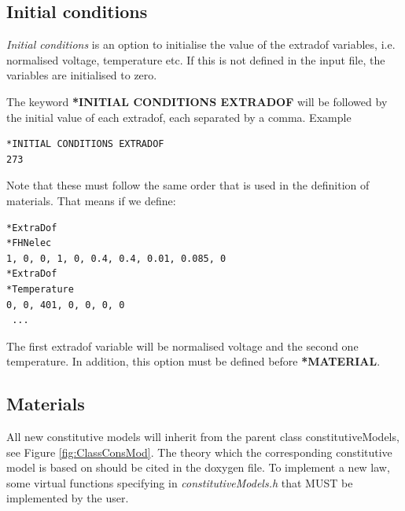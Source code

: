 \documentclass[oneside,11pt,times]{book}
\begin{document}
\subsection{Initial conditions}\label{secInitialConditions}
\textit{Initial conditions} is an option to initialise the value of the  extradof variables, i.e. normalised voltage, temperature etc. If this is not defined in the input file, the variables are initialised to zero.

The keyword \textbf{*INITIAL CONDITIONS EXTRADOF} will be followed by the initial value of each extradof, each separated by a comma.
Example
\begin{lstlisting}
*INITIAL CONDITIONS EXTRADOF
273
\end{lstlisting}

Note that these must follow the same order that is used in the definition of materials. That means if we define:
\begin{lstlisting}
*ExtraDof
*FHNelec
1, 0, 0, 1, 0, 0.4, 0.4, 0.01, 0.085, 0
*ExtraDof
*Temperature
0, 0, 401, 0, 0, 0, 0
 ...
\end{lstlisting}
The first extradof variable will be normalised voltage and the second one temperature.
In addition, this option must be defined before \textbf{*MATERIAL}.

\subsection{Materials}\label{secMaterials}
All new constitutive models will inherit from the parent class constitutiveModels, see Figure \ref{fig:ClassConsMod}. The theory which the corresponding constitutive model is based on should be cited in the doxygen file. To implement a new law, some virtual functions specifying in \textit{constitutiveModels.h} that MUST be implemented by the user.
\end{document}
